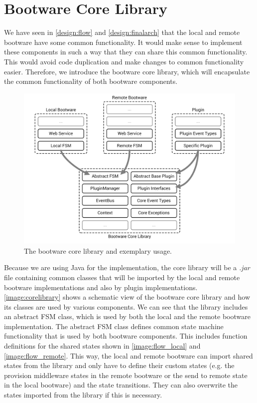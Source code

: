 \section{Bootware Core Library}

We have seen in \autoref{design:flow} and \autoref{design:finalarch} that the local and remote bootware have some common functionality.
It would make sense to implement these components in such a way that they can share this common functionality.
This would avoid code duplication and make changes to common functionality easier.
Therefore, we introduce the bootware core library, which will encapsulate the common functionality of both bootware components.

\begin{figure}[!htbp]
	\centering
	\includegraphics[resolution=600]{implementation/assets/core_library}
	\caption{The bootware core library and exemplary usage.}
	\label{image:corelibrary}
\end{figure}

Because we are using Java for the implementation, the core library will be a \textit{.jar} file containing common classes that will be imported by the local and remote bootware implementations and also by plugin implementations.
\autoref{image:corelibrary} shows a schematic view of the bootware core library and how its classes are used by various components.
We can see that the library includes an abstract FSM class, which is used by both the local and the remote bootware implementation.
The abstract FSM class defines common state machine functionality that is used by both bootware components.
This includes function definitions for the shared states shown in \autoref{image:flow_local} and \autoref{image:flow_remote}.
This way, the local and remote bootware can import shared states from the library and only have to define their custom states (e.g. the provision middleware states in the remote bootware or the send to remote state in the local bootware) and the state transitions.
They can also overwrite the states imported from the library if this is necessary.

